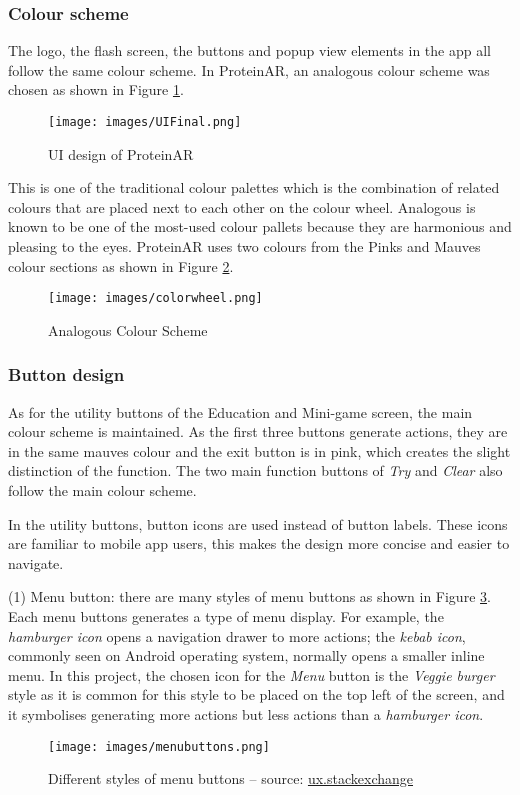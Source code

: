 \subsubsection{Colour scheme}
The logo, the flash screen, the buttons and popup view elements in the app all follow the same colour scheme. In ProteinAR, an analogous colour scheme was chosen as shown in Figure \ref{fig:UIFinal}. 
\begin{figure}[hbt!]
	\centering
	\texttt{[image: images/UIFinal.png]}
	\caption{UI design of ProteinAR}
	\label{fig:UIFinal}
\end{figure}

This is one of the traditional colour palettes which is the combination of related colours that are placed next to each other on the colour wheel. Analogous is known to be one of the most-used colour pallets because they are harmonious and pleasing to the eyes. ProteinAR uses two colours from the Pinks and Mauves colour sections as shown in Figure \ref{fig:colorwheel}. 
\begin{figure}[hbt!]
	\centering
	\texttt{[image: images/colorwheel.png]}
	\caption{Analogous Colour Scheme}
	\label{fig:colorwheel}
\end{figure}


\subsubsection{Button design}
As for the utility buttons of the Education and Mini-game screen, the main colour scheme is maintained. As the first three buttons generate actions, they are in the same mauves colour and the exit button is in pink, which creates the slight distinction of the function. The two main function buttons of \emph{Try} and \emph{Clear} also follow the main colour scheme. 

In the utility buttons, button icons are used instead of button labels. These icons are familiar to mobile app users, this makes the design more concise and easier to navigate. 

(1) Menu button: there are many styles of menu buttons as shown in Figure \ref{fig:menubuttons}. Each menu buttons generates a type of menu display. For example, the \emph{hamburger icon} opens a navigation drawer to more actions; the \emph{kebab icon}, commonly seen on Android operating system, normally opens a smaller inline menu. In this project, the chosen icon for the \emph{Menu} button is the \emph{Veggie burger} style as it is common for this style to be placed on the top left of the screen, and it symbolises generating more actions but less actions than a \emph{hamburger icon}.
\begin{figure}[hbt!]
	\centering
	\texttt{[image: images/menubuttons.png]}
	\caption{Different styles of menu buttons – source: \href{https://ux.stackexchange.com/questions/115468/what-the-difference-between-the-2-menu-icons-3-dots-kebab-and-3-lines-hambur}{ux.stackexchange}}
	\label{fig:menubuttons}
\end{figure}

